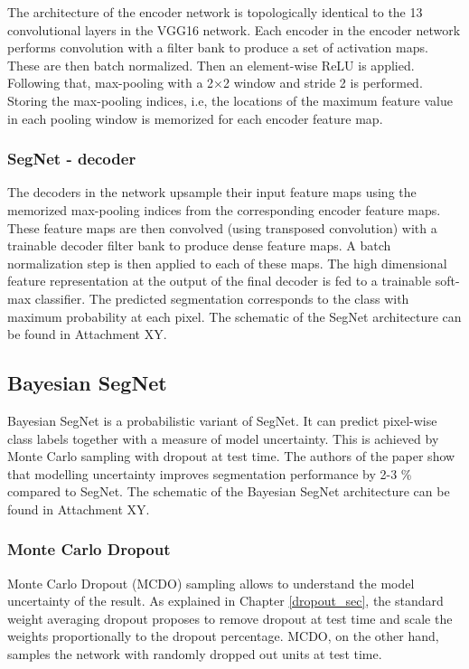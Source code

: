 The architecture of the encoder network is topologically identical to the 13 convolutional layers in the VGG16 network. Each encoder in the encoder network performs convolution with a filter bank to produce a set of activation maps. These are then batch normalized. Then an element-wise ReLU is applied. Following that, max-pooling with a 2×2 window and stride 2 is performed. Storing the max-pooling indices, i.e, the locations of the maximum feature value in each pooling window is memorized for each encoder feature map. \cite{segnet}

\subsubsection{SegNet - decoder}

The decoders in the network upsample their input feature maps using the memorized max-pooling indices from the corresponding encoder feature maps. These feature maps are then convolved (using transposed convolution) with a trainable decoder filter bank to produce dense feature maps. A batch normalization step is then applied to each of these maps. The high dimensional feature representation at the output of the final decoder is fed to a trainable soft-max classifier. The predicted segmentation corresponds to the class with maximum probability at each pixel. \cite{segnet} The schematic of the SegNet architecture can be found in Attachment XY.

\subsection{Bayesian SegNet}

Bayesian SegNet is a probabilistic variant of SegNet. It can predict pixel-wise class labels together with a measure of model uncertainty.  This is achieved by Monte Carlo sampling with dropout at test time. The authors of the paper show that modelling uncertainty improves segmentation performance by 2-3 \% compared to SegNet. The schematic of the Bayesian SegNet architecture can be found in Attachment XY. \cite{bayesian}

\subsubsection{Monte Carlo Dropout}

Monte Carlo Dropout (MCDO) sampling allows to understand the model uncertainty of the result. As explained in Chapter \ref{dropout_sec}, the standard weight averaging dropout proposes to remove dropout at test time and scale the weights proportionally to the dropout percentage. MCDO, on the other hand, samples the network with randomly dropped out units at test time. \cite{bayesian}

